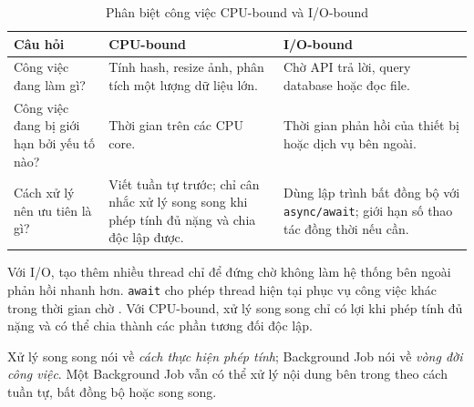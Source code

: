 {\small
\begin{longtable}{|>{\raggedright\arraybackslash}p{}|
                  >{\raggedright\arraybackslash}p{}|
                  >{\raggedright\arraybackslash}p{}|}
\caption{Phân biệt công việc CPU-bound và I/O-bound}\label{tab:cpu-io}\\
\hline
\textbf{Câu hỏi} & \textbf{CPU-bound} & \textbf{I/O-bound} \\
\hline
Công việc đang làm gì? & Tính hash, resize ảnh, phân tích một lượng dữ liệu lớn. & Chờ API trả lời, query database hoặc đọc file. \\
\hline
Công việc đang bị giới hạn bởi yếu tố nào? & Thời gian trên các CPU core. & Thời gian phản hồi của thiết bị hoặc dịch vụ bên ngoài. \\
\hline
Cách xử lý nên ưu tiên là gì? & Viết tuần tự trước; chỉ cân nhắc xử lý song song khi phép tính đủ nặng và chia độc lập được. & Dùng lập trình bất đồng bộ với \texttt{async/await}; giới hạn số thao tác đồng thời nếu cần. \\
\hline
\end{longtable}
}

Với I/O, tạo thêm nhiều thread chỉ để đứng chờ không làm hệ thống bên ngoài phản hồi
nhanh hơn. \texttt{await} cho phép thread hiện tại phục vụ công việc khác trong thời
gian chờ \cite{ms-async-scenarios}. Với CPU-bound, xử lý song song chỉ có lợi khi
phép tính đủ nặng và có thể chia thành các phần tương đối độc lập.

Xử lý song song nói về \textit{cách thực hiện phép tính}; Background Job nói về
\textit{vòng đời công việc}. Một Background Job vẫn có thể xử lý nội dung bên trong
theo cách tuần tự, bất đồng bộ hoặc song song.
